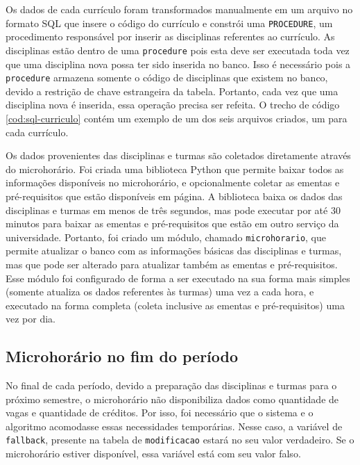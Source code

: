 Os dados de cada currículo foram transformados manualmente em um arquivo no formato SQL que insere o código do currículo e constrói uma \verb|PROCEDURE|, um procedimento responsável por inserir as disciplinas referentes ao currículo. As disciplinas estão dentro de uma \verb|procedure| pois esta deve ser executada toda vez que uma disciplina nova possa ter sido inserida no banco. Isso é necessário pois a \verb|procedure| armazena somente o código de disciplinas que existem no banco, devido a restrição de chave estrangeira da tabela. Portanto, cada vez que uma disciplina nova é inserida, essa operação precisa ser refeita. O trecho de código \ref{cod:sql-curriculo} contém um exemplo de um dos seis arquivos criados, um para cada currículo.



Os dados provenientes das disciplinas e turmas são coletados diretamente através do microhorário. Foi criada uma biblioteca Python que permite baixar todos as informações disponíveis no microhorário, e opcionalmente coletar as ementas e pré-requisitos que estão disponíveis em página. A biblioteca baixa os dados das disciplinas e turmas em menos de três segundos, mas pode executar por até 30 minutos para baixar as ementas e pré-requisitos que estão em outro serviço da universidade. Portanto, foi criado um módulo, chamado \verb|microhorario|, que permite atualizar o banco com as informações básicas das disciplinas e turmas, mas que pode ser alterado para atualizar também as ementas e pré-requisitos. Esse módulo foi configurado de forma a ser executado na sua forma mais simples (somente atualiza os dados referentes às turmas) uma vez a cada hora, e executado na forma completa (coleta inclusive as ementas e pré-requisitos) uma vez por dia.

\subsection{Microhorário no fim do período}
\label{sec:Microhorário no fim do período}

No final de cada período, devido a preparação das disciplinas e turmas para o próximo semestre, o microhorário não disponibiliza dados como quantidade de vagas e quantidade de créditos. Por isso, foi necessário que o sistema e o algoritmo acomodasse essas necessidades temporárias. Nesse caso, a variável de \verb|fallback|, presente na tabela de \verb|modificacao| estará no seu valor verdadeiro. Se o microhorário estiver disponível, essa variável está com seu valor falso.


